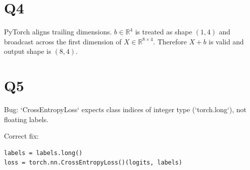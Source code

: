 \documentclass[11pt]{article}
\begin{document}
\section*{Q4}
PyTorch aligns trailing dimensions. $b\in\mathbb{R}^{4}$ is treated as shape $(1,4)$ and broadcast across the first dimension of $X\in\mathbb{R}^{8\times4}$. Therefore $X+b$ is valid and output shape is $(8,4)$.

\section*{Q5}
Bug: `CrossEntropyLoss` expects class indices of integer type (`torch.long`), not floating labels.

Correct fix:
\begin{verbatim}
labels = labels.long()
loss = torch.nn.CrossEntropyLoss()(logits, labels)
\end{verbatim}
\end{document}
